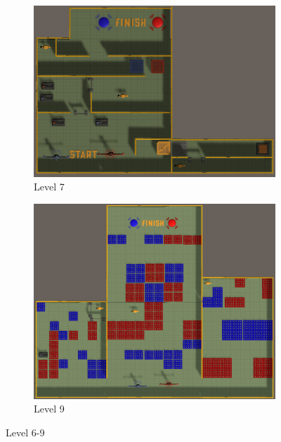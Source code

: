 \begin{figure}[h!]
\begin{subfigure}[b]{0.45\linewidth}
        \includegraphics[width=\linewidth]{images/level_7.png}
        \caption{Level 7}
        \label{fig:level 7}
      \end{subfigure}
    \begin{subfigure}[b]{0.45\linewidth}
        \includegraphics[width=\linewidth]{images/level_9.png}
        \caption{Level 9}
        \label{fig:level 9}
      \end{subfigure}
    \caption{Level 6-9}
\end{figure}